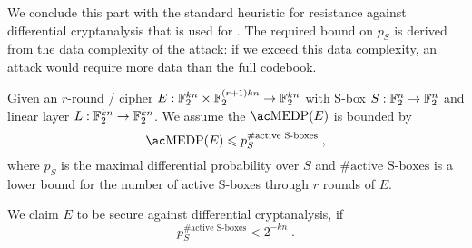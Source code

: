 We conclude this part with the standard heuristic for resistance against differential cryptanalysis that is used for .
The required bound on $p_S$ is derived from the data complexity of the attack: if we exceed this data complexity, an attack would require more data than the full codebook.
\begin{heuristic}\label{heu:dc}
    Given an $r$-round \SPN/ cipher $E : \mathbb{F}_2^{kn} \times \mathbb{F}_2^{(r+1)kn} \to \mathbb{F}_2^{kn}$ with S-box $S : \mathbb{F}_2^n \to \mathbb{F}_2^n$ and linear layer $L : \mathbb{F}_2^{kn} \to \mathbb{F}_2^{kn}$.
    We assume the $\mathrm{\MEDP/}(E)$ is bounded by
    \begin{equation*}
        \mathrm{\MEDP/}(E) \leqslant p_S^{\text{\#active S-boxes}}\;,
    \end{equation*}
    where $p_S$ is the maximal differential probability over $S$ and $\text{\#active S-boxes}$ is a lower bound for the number of active S-boxes through $r$ rounds of $E$.

    We claim $E$ to be secure against differential cryptanalysis, if
    \begin{equation*}
        p_S^{\text{\#active S-boxes}} < 2^{-kn}\;.
    \end{equation*}
\end{heuristic}

